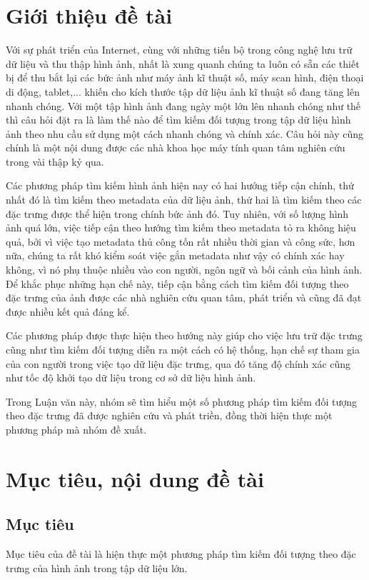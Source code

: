 \documentclass[a4paper,14pt]{extreport}
\begin{document}
\section{Giới thiệu đề tài}
Với sự phát triển của Internet, cùng với những tiến bộ trong công nghệ lưu trữ dữ liệu và thu thập hình ảnh, 
nhất là xung quanh chúng ta luôn có sẵn các thiết bị để thu bắt lại các bức ảnh như máy ảnh kĩ thuật số, máy scan hình, 
điện thoại di động, tablet,... khiến cho kích thước tập dữ liệu ảnh kĩ thuật số đang tăng lên nhanh chóng. 
Với một tập hình ảnh đang ngày một lớn lên nhanh chóng như thế thì câu hỏi đặt ra là làm thế nào để tìm kiếm đối 
tượng trong tập dữ liệu hình ảnh theo nhu cầu sử dụng một cách nhanh chóng và chính xác. Câu hỏi này cũng chính là 
một nội dung được các nhà khoa học máy tính quan tâm nghiên cứu trong vài thập kỷ qua.
\par 
Các phương pháp tìm kiếm hình ảnh hiện nay có hai hướng tiếp cận chính, thứ nhất đó là tìm kiếm theo metadata của dữ liệu ảnh, thứ hai là tìm kiếm 
theo các đặc trưng được thể hiện trong chính bức ảnh đó. Tuy nhiên, với số lượng hình ảnh quá lớn, việc tiếp cận 
theo hướng tìm kiếm theo metadata tỏ ra không hiệu quả, bởi vì việc tạo metadata thủ công tốn rất nhiều thời gian 
và công sức, hơn nữa, chúng ta rất khó kiểm soát việc gắn metadata như vậy có chính xác hay không, vì nó phụ thuộc 
nhiều vào con người, ngôn ngữ và bối cảnh của hình ảnh. Để khắc phục những hạn chế này, tiếp cận bằng cách tìm kiếm 
đối tượng theo đặc trưng của ảnh được các nhà nghiên cứu quan tâm, phát triển và cũng đã đạt được nhiều kết quả đáng kể. 
\par
Các phương pháp được thực hiện theo hướng này giúp cho việc lưu trữ đặc trưng cũng như tìm kiếm đối tượng diễn ra một cách 
có hệ thống, hạn chế sự tham gia của con người trong việc tạo dữ liệu đặc trưng, qua đó tăng độ chính xác cũng như tốc 
độ khởi tạo dữ liệu trong cơ sở dữ liệu hình ảnh.
\par
Trong Luận văn này, nhóm sẽ tìm hiểu một số phương pháp tìm kiếm đối tượng theo đặc trưng đã được nghiên cứu và phát triền, đồng thời hiện thực một phương pháp mà nhóm đề xuất.

\section{Mục tiêu, nội dung đề tài}

\subsection{Mục tiêu}
Mục tiêu của đề tài là hiện thực một phương pháp tìm kiếm đối tượng theo đặc trưng của hình ảnh trong tập dữ liệu lớn.
\end{document}
